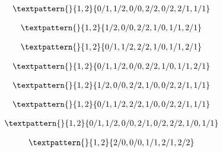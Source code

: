 \begin{equation}
	\begin{gathered}
		\textpattern{}{1,2}{0/1,1/2,0/0,2/2,0/2,2/1,1/1}
	\end{gathered}
	\label{cls:182}
\end{equation}

\begin{equation}
	\begin{gathered}
		\textpattern{}{1,2}{1/2,0/0,2/2,1/0,1/1,2/1}
	\end{gathered}
	\label{cls:183}
\end{equation}

\begin{equation}
	\begin{gathered}
		\textpattern{}{1,2}{0/1,1/2,2/2,1/0,1/1,2/1}
	\end{gathered}
	\label{cls:184}
\end{equation}

\begin{equation}
	\begin{gathered}
		\textpattern{}{1,2}{0/1,1/2,0/0,2/2,1/0,1/1,2/1}
	\end{gathered}
	\label{cls:185}
\end{equation}

\begin{equation}
	\begin{gathered}
		\textpattern{}{1,2}{1/2,0/0,2/2,1/0,0/2,2/1,1/1}
	\end{gathered}
	\label{cls:186}
\end{equation}

\begin{equation}
	\begin{gathered}
		\textpattern{}{1,2}{0/1,1/2,2/2,1/0,0/2,2/1,1/1}
	\end{gathered}
	\label{cls:187}
\end{equation}

\begin{equation}
	\begin{gathered}
		\textpattern{}{1,2}{0/1,1/2,0/0,2/1,0/2,2/2,1/0,1/1}
	\end{gathered}
	\label{cls:188}
\end{equation}

\begin{equation}
	\begin{gathered}
		\textpattern{}{1,2}{2/0,0/0,1/1,2/1,2/2}
	\end{gathered}
	\label{cls:189}
\end{equation}

